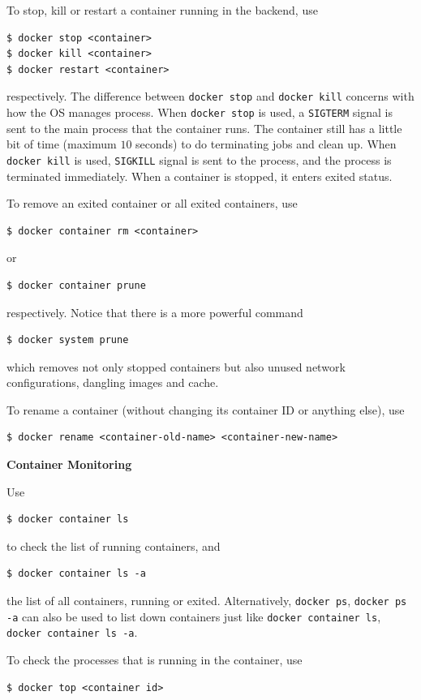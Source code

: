 To stop, kill or restart a container running in the backend, use
\begin{lstlisting}
$ docker stop <container>
$ docker kill <container>
$ docker restart <container>
\end{lstlisting}
respectively. The difference between \verb|docker stop| and \verb|docker kill| concerns with how the OS manages process. When \verb|docker stop| is used, a  \verb|SIGTERM| signal is sent to the main process that the container runs. The container still has a little bit of time (maximum $10$ seconds) to do terminating jobs and clean up. When \verb|docker kill| is used, \verb|SIGKILL| signal is sent to the process, and the process is terminated immediately. When a container is stopped, it enters exited status.

To remove an exited container or all exited containers, use
\begin{lstlisting}
$ docker container rm <container>
\end{lstlisting}
or
\begin{lstlisting}
$ docker container prune
\end{lstlisting}
respectively. Notice that there is a more powerful command
\begin{lstlisting}
$ docker system prune
\end{lstlisting}
which removes not only stopped containers but also unused network configurations, dangling images and cache.

To rename a container (without changing its container ID or anything else), use
\begin{lstlisting}
$ docker rename <container-old-name> <container-new-name>
\end{lstlisting}

\vspace{0.1in}
\noindent \textbf{Container Monitoring}
\vspace{0.1in}

Use
\begin{lstlisting}
$ docker container ls
\end{lstlisting}
to check the list of running containers, and
\begin{lstlisting}
$ docker container ls -a
\end{lstlisting}
the list of all containers, running or exited. Alternatively, \verb|docker ps|, \verb|docker ps -a| can also be used to list down containers just like \verb|docker container ls|, \verb|docker container ls -a|.

To check the processes that is running in the container, use
\begin{lstlisting}
$ docker top <container id>
\end{lstlisting}

